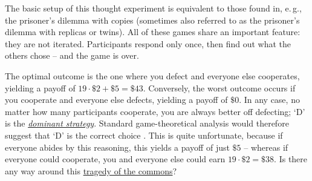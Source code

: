 The basic setup of this thought experiment is equivalent to those found
in, e.\,g., the prisoner's dilemma with copies (sometimes also referred to
as the prisoner's dilemma with replicas or twins). All of these games
share an important feature: they are not iterated. Participants respond
only once, then find out what the others chose -- and the game is over.

The optimal outcome is the one where you defect and everyone else
cooperates, yielding a payoff of \(19 \cdot \$ 2 + \$ 5 = \$ 43\).
Conversely, the worst outcome occurs if you cooperate and everyone else
defects, yielding a payoff of \(\$ 0\). In any case, no matter how many
participants cooperate, you are always better off defecting; `D' is the
\href{https://en.wikipedia.org/wiki/Strategic_dominance}{\emph{dominant
strategy}}. Standard game-theoretical analysis would therefore suggest
that `D' is the correct choice
\parencite{Binmore2007-uc,Osborne2004-ui}. This is quite
unfortunate, because if everyone abides by this reasoning, this yields a
payoff of just \(\$ 5\) -- whereas if everyone could cooperate, you and
everyone else could earn \(19 \cdot \$ 2 = \$ 38\). Is there any way
around this
\href{https://en.wikipedia.org/wiki/Tragedy_of_the_commons}{tragedy
of the commons}?

